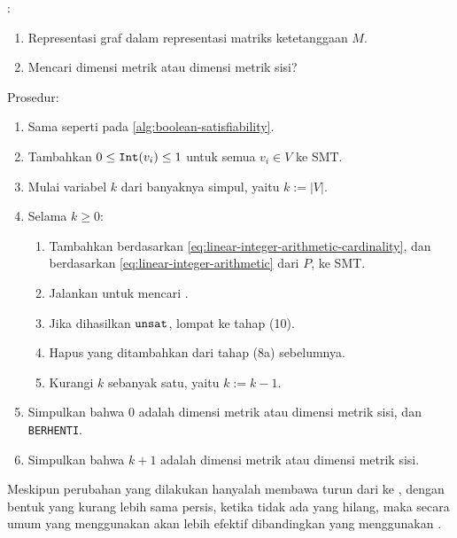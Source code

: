 \begin{algorithm}[H]
	:
	\begin{enumerate}
		\item Representasi graf dalam representasi matriks ketetanggaan \(M\).
		\item Mencari dimensi metrik atau dimensi metrik sisi?
	\end{enumerate}
	Prosedur:
	\begin{enumerate}
		\item[1--5.] Sama seperti pada \autoref{alg:boolean-satisfiability}.
		\setcounter{enumi}{5}
		\item Tambahkan  \(0 \leq \mathtt{Int}(v_i) \leq 1\) untuk semua \(v_i \in V\) ke  SMT.
		\item Mulai variabel \(k\) dari banyaknya simpul, yaitu \(k := |V|\).
		\item Selama \(k \geq 0\):
			\begin{enumerate}
					\item Tambahkan  berdasarkan \autoref{eq:linear-integer-arithmetic-cardinality}, dan berdasarkan \autoref{eq:linear-integer-arithmetic} dari \(P\), ke  SMT.
					\item Jalankan  untuk mencari .
					\item Jika dihasilkan \(\mathtt{unsat}\), lompat ke tahap (10).
					\item Hapus  yang ditambahkan dari tahap (8a) sebelumnya.
					\item Kurangi \(k\) sebanyak satu, yaitu \(k := k - 1\).
			\end{enumerate}
		\item Simpulkan bahwa 0 adalah dimensi metrik atau dimensi metrik sisi, dan \texttt{BERHENTI}.
		\item Simpulkan bahwa \(k + 1\) adalah dimensi metrik atau dimensi metrik sisi.
	\end{enumerate}
	\caption{}
	\label{alg:linear-integer-arithmetic}
\end{algorithm}

\vspace{-0.5em}

Meskipun perubahan yang dilakukan hanyalah membawa turun dari  ke , dengan bentuk  yang kurang lebih sama persis, ketika tidak ada  yang hilang, maka secara umum  yang menggunakan  akan lebih efektif dibandingkan yang menggunakan .

